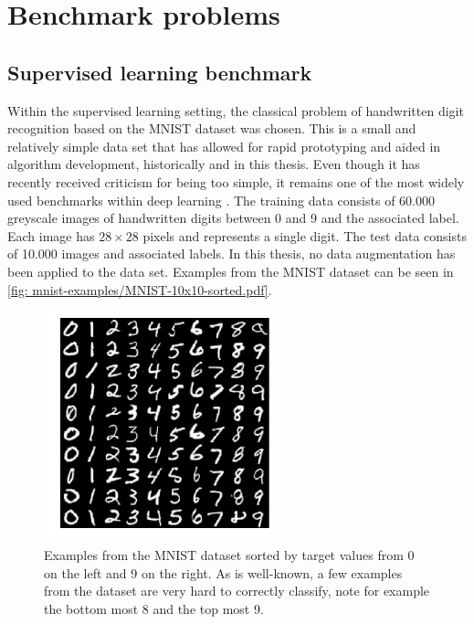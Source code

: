 
\section{Benchmark problems}\label{sec: Experimental work: Benchmarking}
\subsection{Supervised learning benchmark}
Within the supervised learning setting, the classical problem of handwritten digit recognition based on the \gls{MNIST} dataset \cite{LeCun1998} was chosen. This is a small and relatively simple data set that has allowed for rapid prototyping and aided in algorithm development, historically and in this thesis. Even though it has recently received criticism for being too simple, it remains one of the most widely used benchmarks within deep learning \cite{Xiao2017}. The training data consists of 60.000 greyscale images of handwritten digits between 0 and 9 and the associated label. Each image has $28\times28$ pixels and represents a single digit. The test data consists of 10.000 images and associated labels.
In this thesis, no data augmentation has been applied to the data set. Examples from the \gls{MNIST} dataset can be seen in \autoref{fig: mnist-examples/MNIST-10x10-sorted.pdf}.
\begin{figure}[tbp!]
    \centering
    \includegraphics[width=0.60\textwidth]{graphics/mnist-examples/MNIST-10x10-sorted.pdf}
    \caption{
        Examples from the \gls{MNIST} dataset sorted by target values from 0 on the left and 9 on the right. As is well-known, a few examples from the dataset are very hard to correctly classify, note for example the bottom most 8 and the top most 9.
    }
    \label{fig: mnist-examples/MNIST-10x10-sorted.pdf}
\end{figure}

